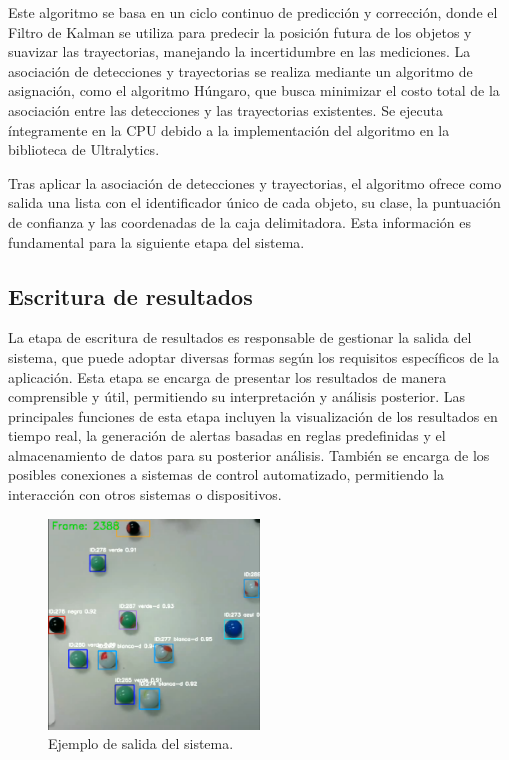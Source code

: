 \documentclass[11pt,spanish,listoffigures,listoftables]{tfgetsinf}
\begin{document}
Este algoritmo se basa en un ciclo continuo de predicción y corrección, donde el Filtro de Kalman se utiliza para predecir la posición futura de los objetos y suavizar las trayectorias, manejando la incertidumbre en las mediciones. La asociación de detecciones y trayectorias se realiza mediante un algoritmo de asignación, como el algoritmo Húngaro, que busca minimizar el costo total de la asociación entre las detecciones y las trayectorias existentes. Se ejecuta íntegramente en la CPU debido a la implementación del algoritmo en la biblioteca de Ultralytics.

Tras aplicar la asociación de detecciones y trayectorias, el algoritmo ofrece como salida una lista con el identificador único de cada objeto, su clase, la puntuación de confianza y las coordenadas de la caja delimitadora. Esta información es fundamental para la siguiente etapa del sistema.

\subsection{Escritura de resultados} \label{sec:escritura_resultados}

La etapa de escritura de resultados es responsable de gestionar la salida del sistema, que puede adoptar diversas formas según los requisitos específicos de la aplicación. Esta etapa se encarga de presentar los resultados de manera comprensible y útil, permitiendo su interpretación y análisis posterior. Las principales funciones de esta etapa incluyen la visualización de los resultados en tiempo real, la generación de alertas basadas en reglas predefinidas y el almacenamiento de datos para su posterior análisis. También se encarga de los posibles conexiones a sistemas de control automatizado, permitiendo la interacción con otros sistemas o dispositivos.

\begin{figure}[H]
   \centering
   \includegraphics[width=0.5\textwidth]{images/diseno_e_implementacion/ejemplo_canicas_resultado.png}
   \caption[Ejemplo de salida del sistema]{Ejemplo de salida del sistema.}
   \label{fig:resultado_sistema}
\end{figure}
\end{document}

